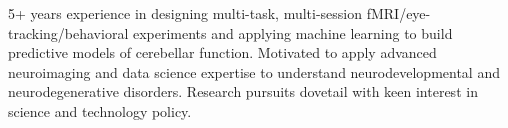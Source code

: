 

\begin{cvparagraph}

5+ years experience in designing multi-task, multi-session fMRI/eye-tracking/behavioral experiments and applying machine learning to build predictive models of cerebellar function. Motivated to apply advanced neuroimaging and data science expertise to understand neurodevelopmental and neurodegenerative disorders. Research pursuits dovetail with keen interest in science and technology policy.

\end{cvparagraph}
